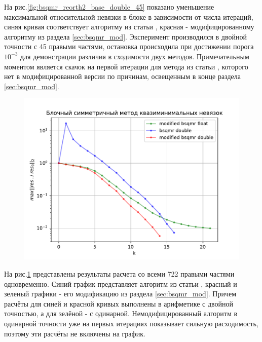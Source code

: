 \par На рис.\ref{fig:bsqmr_reorth2_base_double_45} показано уменьшение максимальной
относительной невязки в блоке в зависимости от числа итераций, синяя кривая соответствует 
алгоритму из статьи \cite{doi:10.1137/0917019}, красная - модифицированному алгоритму из
раздела \ref{sec:bsqmr_mod}. Эксперимент производился в двойной точности с 45 правыми частями, 
остановка происходила при достижении порога $10^{-3}$ для демонстрации различия в сходимости двух методов.
Примечательным моментом является скачок на первой итерации для метода из статьи \cite{doi:10.1137/0917019}, которого
нет в модифицированной версии по причинам, освещенным в конце раздела \ref{sec:bsqmr_mod}.

\begin{figure}[H]
    \centering
    \includegraphics[width=0.7\linewidth]{images/bsqmr_722_base_reorth2_doublevsfloat.pdf}
    \caption{}
    \label{fig:bsqmr_722_base_reorth2_doublevsfloat}
\end{figure}

\par На рис.\ref{fig:bsqmr_722_base_reorth2_doublevsfloat} представлены результаты 
расчета со всеми 722 правыми частями одновременно. Синий график представляет алгоритм
из статьи \cite{doi:10.1137/0917019}, красный и зеленый графики - его модификацию из раздела \ref{sec:bsqmr_mod}.
Причем расчёты для синей и красной кривых выполнены в арифметике с двойной точностью, а для зелёной - с одинарной.
Немодифицированный алгоритм в одинарной точности уже на первых итерациях показывает сильную расходимость,
поэтому эти расчёты не включены на график. 

